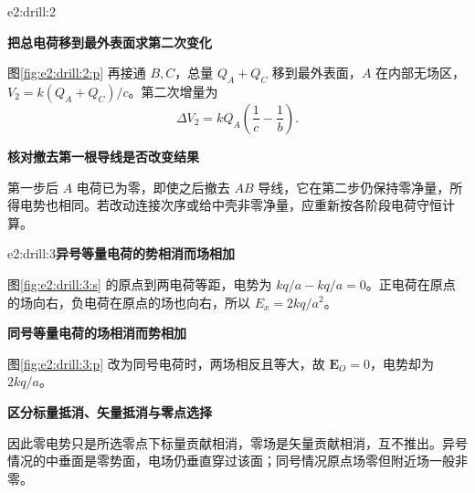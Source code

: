 \begin{drillsolution}{e2:drill:2}
\par\medskip{}\noindent\textbf{把总电荷移到最外表面求第二次变化}\par\nobreak
图\ref{fig:e2:drill:2:p} 再接通 $B,C$，总量 $Q_A+Q_C$ 移到最外表面，$A$ 在内部无场区，$V_2=k(Q_A+Q_C)/c$。第二次增量为
\[
 \Delta V_2=kQ_A\left(\frac1c-\frac1b\right).
\]


\par\medskip{}\noindent\textbf{核对撤去第一根导线是否改变结果}\par\nobreak
第一步后 $A$ 电荷已为零，即使之后撤去 $AB$ 导线，它在第二步仍保持零净量，所得电势也相同。若改动连接次序或给中壳非零净量，应重新按各阶段电荷守恒计算。\end{drillsolution}
\begin{drillsolution}{e2:drill:3}\textbf{异号等量电荷的势相消而场相加}\par\nobreak
图\ref{fig:e2:drill:3:s} 的原点到两电荷等距，电势为 $kq/a-kq/a=0$。正电荷在原点的场向右，负电荷在原点的场也向右，所以 $E_x=2kq/a^2$。



\par\medskip{}\noindent\textbf{同号等量电荷的场相消而势相加}\par\nobreak
图\ref{fig:e2:drill:3:p} 改为同号电荷时，两场相反且等大，故 $\bm E_O=0$，电势却为 $2kq/a$。

\par\medskip{}\noindent\textbf{区分标量抵消、矢量抵消与零点选择}\par\nobreak
因此零电势只是所选零点下标量贡献相消，零场是矢量贡献相消，互不推出。异号情况的中垂面是零势面，电场仍垂直穿过该面；同号情况原点场零但附近场一般非零。\end{drillsolution}

